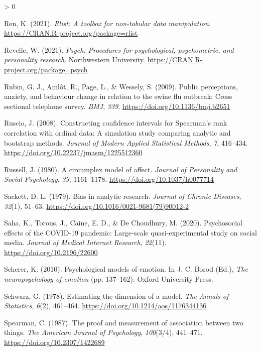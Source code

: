 \documentclass[
  english,
  jou,floatsintext]{apa7}
\newlength{\cslhangindent}
\newenvironment{CSLReferences}[2] %
 {%
  \setlength{\parindent}{0pt}
  \ifodd #1 \everypar{\setlength{\hangindent}{\cslhangindent}}\ignorespaces\fi
  \ifnum #2 > 0
  \setlength{\parskip}{#2\baselineskip}
  \fi
 }%
 {}
\begin{document}
\begin{CSLReferences}{1}{0}
\leavevmode\hypertarget{ref-R-rlist}{}%
Ren, K. (2021). \emph{Rlist: A toolbox for non-tabular data manipulation}. \url{https://CRAN.R-project.org/package=rlist}

\leavevmode\hypertarget{ref-R-psych}{}%
Revelle, W. (2021). \emph{Psych: Procedures for psychological, psychometric, and personality research}. Northwestern University. \url{https://CRAN.R-project.org/package=psych}

\leavevmode\hypertarget{ref-Rubin2009}{}%
Rubin, G. J., Amlôt, R., Page, L., \& Wessely, S. (2009). Public perceptions, anxiety, and behaviour change in relation to the swine flu outbreak: Cross sectional telephone survey. \emph{BMJ}, \emph{339}. \url{https://doi.org/10.1136/bmj.b2651}

\leavevmode\hypertarget{ref-Ruscio2008}{}%
Ruscio, J. (2008). Constructing confidence intervals for {Spearman's} rank correlation with ordinal data: A simulation study comparing analytic and bootstrap methods. \emph{Journal of Modern Applied Statistical Methods}, \emph{7}, 416--434. \url{https://doi.org/10.22237/jmasm/1225512360}

\leavevmode\hypertarget{ref-russell1980}{}%
Russell, J. (1980). A circumplex model of affect. \emph{Journal of Personality and Social Psychology}, \emph{39}, 1161--1178. \url{https://doi.org/10.1037/h0077714}

\leavevmode\hypertarget{ref-SACKETT197951}{}%
Sackett, D. L. (1979). Bias in analytic research. \emph{Journal of Chronic Diseases}, \emph{32}(1), 51--63. \url{https://doi.org/10.1016/0021-9681(79)90012-2}

\leavevmode\hypertarget{ref-Saha2020}{}%
Saha, K., Torous, J., Caine, E. D., \& De Choudhury, M. (2020). Psychosocial effects of the COVID-19 pandemic: Large-scale quasi-experimental study on social media. \emph{Journal of Medical Internet Research}, \emph{22}(11). \url{https://doi.org/10.2196/22600}

\leavevmode\hypertarget{ref-Scherer2000}{}%
Scherer, K. (2010). Psychological models of emotion. In J. C. Borod (Ed.), \emph{The neuropsychology of emotion} (pp. 137--162). Oxford University Press.

\leavevmode\hypertarget{ref-Schwarz1978}{}%
Schwarz, G. (1978). Estimating the dimension of a model. \emph{The Annals of Statistics}, \emph{6}(2), 461--464. \url{https://doi.org/10.1214/aos/1176344136}

\leavevmode\hypertarget{ref-Spearman1900}{}%
Spearman, C. (1987). The proof and measurement of association between two things. \emph{The American Journal of Psychology}, \emph{100}(3/4), 441--471. \url{https://doi.org/10.2307/1422689}


\end{CSLReferences}
\end{document}
